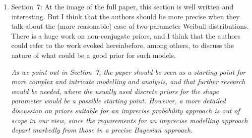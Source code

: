 \documentclass[Journal,SectionNumbers,SingleSpace,InsideFigs]{ascelike}
\begin{document}
\begin{enumerate}
\smallskip
\item Section~7: At the image of the full paper, this section is well written and interesting.
But I think that the authors should be more precise when they talk about the (more reasonable) case of two-parameter Weibull distributions.
There is a huge work on non-conjugate priors, and I think that the authors could refer to the work evoked hereinbefore,
among others, to discuss the nature of what could be a good prior for such models.

\smallskip
\emph{As we point out in Section~7, the paper should be seen as a starting point for more complex and intricate modelling and analysis,
and that further research would be needed, where the usually used discrete priors for the shape parameter would be a possible starting point.
However, a more detailed discussion on priors suitable for an imprecise probability approach is out of scope in our view,
since the requirements for an imprecise modelling approach depart markedly from those in a precise Bayesian approach.}
\end{enumerate}
\end{document}
